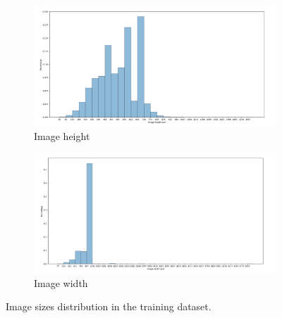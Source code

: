 \documentclass[12pt,
    brazil,			%
	english,        %
	]{article}
\begin{document}
\begin{figure}
    \centering
    \begin{subfigure}[b]{\textwidth}
        \includegraphics[width=\textwidth]{images/graphs/train-height-distribution.png}
        \caption{Image height}
    \end{subfigure}
    \hfill
    \begin{subfigure}[b]{\textwidth}
        \includegraphics[width=\textwidth]{images/graphs/train-width-distribution.png}
        \caption{Image width}
    \end{subfigure}
    \caption{Image sizes distribution in the training dataset.}
    \label{fig:image-sizes:training}
\end{figure}
\end{document}
